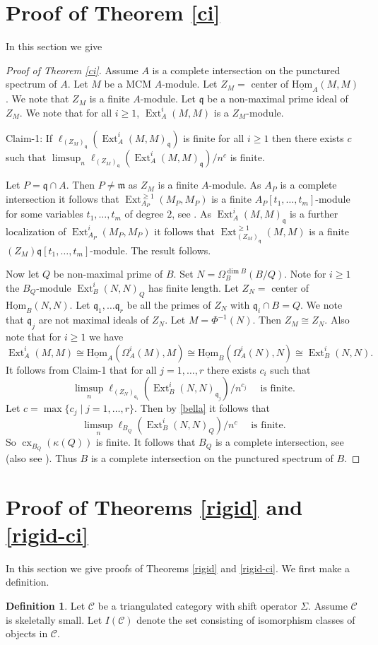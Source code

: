 \documentclass{amsart}
\newcommand{\m}{\mathfrak{m} }
\newcommand{\q}{\mathfrak{q} }
\newcommand{\C}{\mathcal{C}}
\newcommand{\cx}{\operatorname{cx}}
\newcommand{\sHom}{\operatorname{\underline{Hom}}}
\newcommand{\Ext}{\operatorname{Ext}}
\theoremstyle{plain}
\theoremstyle{definition}
\newtheorem{definition}[theorem]{Definition}
\theoremstyle{remark}
\begin{document}
{\section{Proof of Theorem \ref{ci}}
In this section we give
\begin{proof}[Proof of Theorem \ref{ci}]
Assume $A$ is a complete intersection on the punctured spectrum of $A$. Let $M$ be a MCM $A$-module. Let $Z_M = $ center of $\sHom_A(M, M)$. We note that $Z_M$ is a finite $A$-module.
Let $\q$ be a non-maximal prime ideal of $Z_M$. We note that for all $i \geq 1$, $\Ext^i_A(M, M)$ is a $Z_M$-module.

Claim-1: If $\ell_{(Z_M)_\q}(\Ext^i_A(M,M)_\q)$ is finite for all $i \geq 1$ then there exists $c$ such that $\limsup_n \ell_{(Z_M)_\q}(\Ext^i_A(M,M)_\q) /n^c$ is finite.

Let $P = \q \cap A$. Then $P \neq \m$ as $Z_M$ is a finite $A$-module. As $A_P$ is a complete intersection it follows that $\Ext^{\geq 1}_{A_P}(M_P, M_P)$ is a finite $A_P[t_1,\ldots, t_m]$-module for some variables $t_1,\ldots,t_m$ of degree $2$, see \cite[4.9]{AGP}. As $\Ext^i_A(M,M)_\q$ is a further localization of $\Ext^i_{A_P}(M_P, M_P)$ it follows that $\Ext^{\geq 1}_{(Z_M)_\q}(M, M)$ is a finite $(Z_M)\q[t_1,\ldots, t_m]$-module. The result follows.

Now let $Q$ be non-maximal prime of $B$. Set $N = \Omega^{\dim B}_B(B/Q)$. Note for $i \geq 1$ the $B_Q$-module $\Ext^i_B(N, N)_Q$ has finite length. Let $Z_N = $ center of $\sHom_B(N,N)$. Let $\q_1, \ldots \q_r$ be all the primes of $Z_N$ with $\q_i \cap B = Q$. We note that $\q_j$ are not maximal ideals of $Z_N$. Let $M =\Phi^{-1}(N)$. Then $Z_M \cong Z_N$. Also note that for $i \geq 1$ we have
$$\Ext^i_A(M, M) \cong \sHom_A(\Omega_A^i(M), M) \cong \sHom_B(\Omega_A^i(N), N) \cong \Ext^i_B(N, N). $$
It follows from Claim-1 that for all $j = 1, \ldots,r$ there exists  $c_i$ such that  $$\limsup_n \ell_{(Z_N)_{\q_i}}(\Ext^i_B(N,N)_{\q_j}) /n^{c_j} \quad \text{ is finite}.$$
Let $c = \max\{c_j \mid j = 1, \ldots, r \}$. Then by \ref{bella} it follows that  $$\limsup_n \ell_{B_Q}(\Ext^i_B(N,N)_{Q}) /n^{c} \quad \text{ is finite}.$$
So $\cx_{B_Q}(\kappa(Q))$ is finite. It follows that $B_Q$ is a complete intersection, see \cite{G-ci} (also see \cite[8.1.2]{A}). Thus $B$ is a complete intersection on the punctured spectrum of $B$.
\end{proof}
\section{Proof of Theorems \ref{rigid} and \ref{rigid-ci}}
In this section we give proofs of Theorems \ref{rigid} and \ref{rigid-ci}. We first make a definition.
\begin{definition}\label{tri-f}
 Let $\C$ be a triangulated category with shift operator $\Sigma$. Assume $\C$ is skeletally small. Let $I(\C)$ denote the set consisting of isomorphism classes of objects in $\C$.



\end{definition}}
\end{document}
